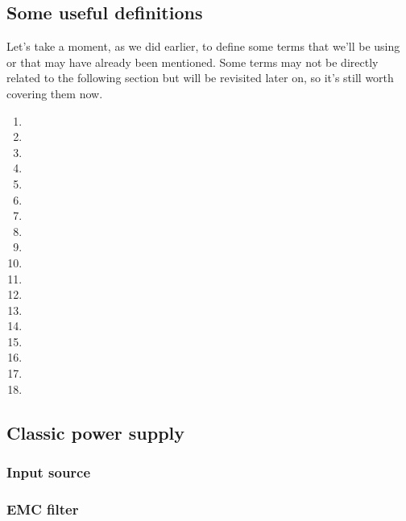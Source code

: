 \documentclass[../main.tex]{subfiles}
\begin{document}

\subsection{Some useful definitions}

Let’s take a moment, as we did earlier, to define some terms that we’ll be using or that may have already been mentioned.
Some terms may not be directly related to the following section but will be revisited later on, so it’s still worth covering them now.

\begin{enumerate}
	\item[\textbf{-}]  
	\item[\textbf{-}]
	\item[\textbf{-}]
	\item[\textbf{-}]
	\item[\textbf{-}]
	\item[\textbf{-}]
	\item[\textbf{-}]
	\item[\textbf{-}]
	\item[\textbf{-}]
	\item[\textbf{-}]  
	\item[\textbf{-}]
	\item[\textbf{-}]
	\item[\textbf{-}]
	\item[\textbf{-}]
	\item[\textbf{-}]
	\item[\textbf{-}]
	\item[\textbf{-}]
	\item[\textbf{-}]
\end{enumerate}

\subsection{Classic power supply}

\subsubsection{Input source}

\subsubsection{EMC filter}
\end{document}
